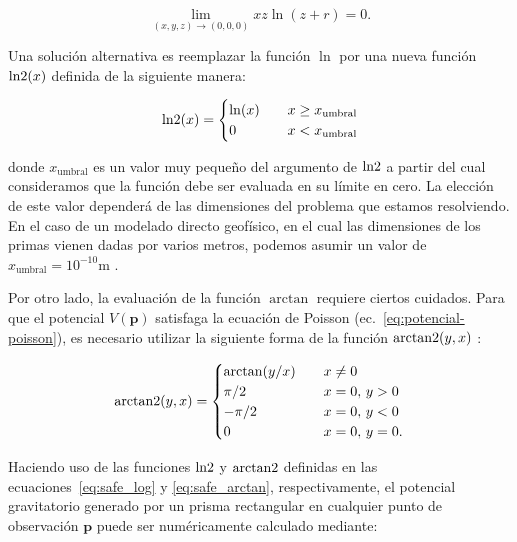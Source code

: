 \begin{equation}
    \lim_{(x, y, z)\rightarrow (0, 0, 0)} xz \ln(z + r) = 0.
\end{equation}

Una solución alternativa es reemplazar la función $\ln$ por una nueva función
$\operatorname{ln2}(x)$ definida de la siguiente manera:

\begin{equation}
    \operatorname{ln2}(x) =
    \begin{cases}
        \ln(x) & \quad x \ge x_\text{umbral} \\
        0      & \quad x < x_\text{umbral}
    \end{cases}
    \label{eq:safe_log}
\end{equation}

\noindent donde $x_\text{umbral}$ es un valor muy pequeño del argumento de
$\operatorname{ln2}$ a partir del cual consideramos que la función debe ser evaluada en
su límite en cero.
La elección de este valor dependerá de las dimensiones del problema que estamos
resolviendo.
En el caso de un modelado directo geofísico, en el cual las dimensiones de los
primas vienen dadas por varios metros, podemos asumir un valor de
$x_\text{umbral} = 10^{-10}$m \citep{harmonica2021}.

Por otro lado, la evaluación de la función $\arctan$ requiere ciertos cuidados.
Para que el potencial $V(\mathbf{p})$ satisfaga la ecuación de Poisson
(ec.~\ref{eq:potencial-poisson}), es necesario utilizar la siguiente forma de
la función $\operatorname{arctan2}(y, x)$ \citep{fukushima2020}:

\begin{equation}
    \operatorname{arctan2}(y, x) =
    \begin{cases}
        \arctan(y / x) & \quad x \ne 0 \\
        \pi / 2        & \quad x = 0,\, y > 0 \\
        -\pi / 2       & \quad x = 0,\, y < 0 \\
        0              & \quad x = 0,\, y = 0.
    \end{cases}
    \label{eq:safe_arctan}
\end{equation}

Haciendo uso de las funciones $\operatorname{ln2}$ y $\operatorname{arctan2}$ definidas en las
ecuaciones~\ref{eq:safe_log} y \ref{eq:safe_arctan}, respectivamente, el
potencial gravitatorio generado por un prisma rectangular en cualquier punto de
observación $\mathbf{p}$ puede ser numéricamente calculado mediante:

